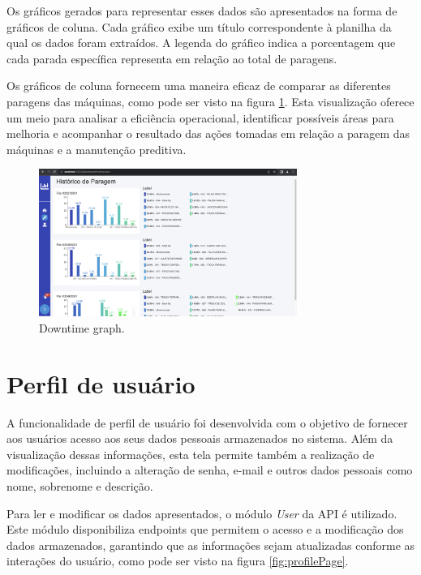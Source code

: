Os gráficos gerados para representar esses dados são apresentados na forma de gráficos de coluna. Cada gráfico exibe um título correspondente à planilha da qual os dados foram extraídos. A legenda do gráfico indica a porcentagem que cada parada específica representa em relação ao total de paragens.

Os gráficos de coluna fornecem uma maneira eficaz de comparar as diferentes paragens das máquinas, como pode ser visto na figura \ref{fig:downtime}. Esta visualização oferece um meio para analisar a eficiência operacional, identificar possíveis áreas para melhoria e acompanhar o resultado das ações tomadas em relação a paragem das máquinas e a manutenção preditiva.

\begin{figure}[htbp]
	\centering
	\includegraphics[width=0.75\textwidth]{images/downtime.png}
	\caption{Downtime graph.}
	\label{fig:downtime}
\end{figure}

\section[Perfil de usuário]{Perfil de usuário}\label{sec:profile}

A funcionalidade de perfil de usuário foi desenvolvida com o objetivo de fornecer aos usuários acesso aos seus dados pessoais armazenados no sistema. Além da visualização dessas informações, esta tela permite também a realização de modificações, incluindo a alteração de senha, e-mail e outros dados pessoais como nome, sobrenome e descrição.

Para ler e modificar os dados apresentados, o módulo \textit{User} da \gls{API} é utilizado. Este módulo disponibiliza endpoints que permitem o acesso e a modificação dos dados armazenados, garantindo que as informações sejam atualizadas conforme as interações do usuário, como pode ser visto na figura \ref{fig:profilePage}.

